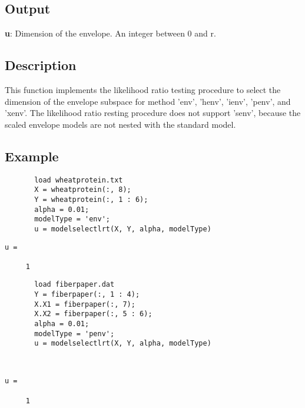 \documentclass[a4paper,11pt,openany]{memoir}
\begin{document}
\subsection*{Output}

\begin{par}
\textbf{u}: Dimension of the envelope. An integer between 0 and r.
\end{par} \vspace{1em}


\subsection*{Description}

\begin{par}
This function implements the likelihood ratio testing procedure to select the dimension of the envelope subspace for method 'env', 'henv', 'ienv', 'penv', and 'xenv'.  The likelihood ratio resting procedure does not support 'senv', because the scaled envelope models are not nested with the standard model.
\end{par} \vspace{1em}


\subsection*{Example}


\begin{verbatim}       load wheatprotein.txt
       X = wheatprotein(:, 8);
       Y = wheatprotein(:, 1 : 6);
       alpha = 0.01;
       modelType = 'env';
       u = modelselectlrt(X, Y, alpha, modelType)\end{verbatim}
            \color{lightgray}\ttfamily \begin{verbatim}
u =

     1
\end{verbatim} \rmfamily
\color{black}
\begin{verbatim}       load fiberpaper.dat
       Y = fiberpaper(:, 1 : 4);
       X.X1 = fiberpaper(:, 7);
       X.X2 = fiberpaper(:, 5 : 6);
       alpha = 0.01;
       modelType = 'penv';
       u = modelselectlrt(X, Y, alpha, modelType)\end{verbatim}
    


        \color{lightgray}\ttfamily \begin{verbatim}


u =

     1

\end{verbatim} \rmfamily
\color{black}
    
\end{document}
